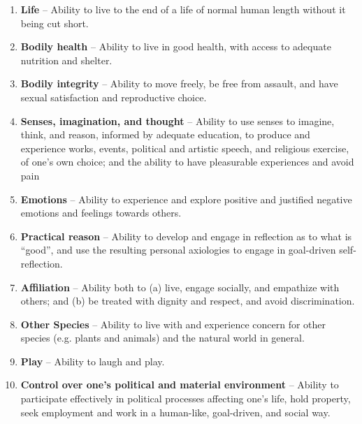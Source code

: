 \documentclass[letterpaper]{article} %
\begin{document}
\begin{enumerate}
    \item \textbf{Life} -- Ability to live to the end of a life of normal human length without it being cut short.
    \item \textbf{Bodily health} -- Ability to live in good health, with access to adequate nutrition and shelter. 
    \item \textbf{Bodily integrity} -- Ability to move freely, be free from assault, and have sexual satisfaction and reproductive choice.
    \item \textbf{Senses, imagination, and thought} -- Ability to use senses to imagine, think, and reason, 
    informed by adequate education,
    to produce and experience works, events, political and artistic speech, and religious exercise, of one's own choice; and the ability to have pleasurable experiences and avoid pain
    \item \textbf{Emotions} -- Ability to experience and explore positive and justified negative emotions and feelings towards others. %
    \item \textbf{Practical reason} -- Ability to develop and engage in reflection as to what is ``good'', and use the resulting personal axiologies to engage in goal-driven self-reflection. 
    \item \textbf{Affiliation} -- Ability both to (a) live, engage socially, and empathize with others; and (b) be treated with dignity and respect, and avoid discrimination.
    \item \textbf{Other Species} -- Ability to live with and experience concern for other species (e.g. plants and animals) and the natural world in general.
    \item \textbf{Play} -- Ability to laugh and play.
    \item \textbf{Control over one's political and material environment} -- 
    Ability to participate effectively in political processes affecting one's life, hold property, seek employment and work in a human-like, goal-driven, and social way.
\end{enumerate}
\end{document}
